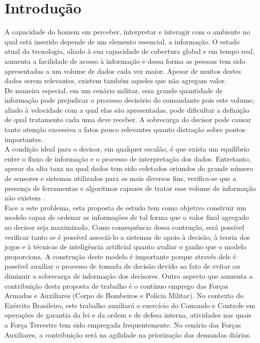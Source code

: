 \documentclass[a4paper,12pt]{article}
\begin{document}
\section{Introdução}
A capacidade do homem em perceber, interpretar e interagir com o ambiente no qual está inserido depende de um elemento essencial, a informação.
O estado atual da tecnologia, aliado à sua capacidade de cobertura global e em tempo real, aumenta a facilidade de acesso à informação e dessa forma as pessoas 
tem sido apresentadas a um volume de dados cada vez maior. Apesar de muitos destes dados serem relevantes, existem também aqueles que não agregam valor.\\
\indent De maneira especial, em um cenário militar, essa grande quantidade de informação pode prejudicar o processo decisório do 
comandante pois este volume, aliado à velocidade com a qual elas são apresentadas, pode dificultar a definição de qual tratamento cada uma deve receber.
A sobrecarga do decisor pode causar tanto atenção excessiva a fatos pouco relevantes quanto distração sobre pontos importantes.\\
\indent A condição ideal para o decisor, em qualquer escalão, é que exista um equilíbrio entre o fluxo de informação e o processo de interpretação dos dados.
Entretanto, apesar da alta taxa na qual dados tem sido coletados oriundos do grande número de sensores e sistemas utilizados para os mais diversos fins, 
verifica-se que a presença de ferramentas e algoritmos capazes de tratar esse volume de informação não existem \cite{Savas 2014}.\\
\indent Face a este problema, esta proposta de estudo tem como objetivo construir um modelo capaz de ordenar as informações 
de tal forma que o valor final agregado ao decisor seja maximizado. Como consequência dessa contrução, será possível verificar 
tanto se é possível associá-lo a sistemas de apoio à decisão, à teoria dos jogos e à técnicas de inteligência artificial quanto 
avaliar o ganho que o modelo proporciona.
\indent A construção deste modelo é importante porque através dele é possível auxiliar o processo de tomada de decisão devido ao fato de evitar ou diminuir 
a sobrecarga de informação dos decisores. Outro aspecto que aumenta a contribuição desta proposta de trabalho é o contínuo emprego das Forças Armadas e 
Auxiliares (Corpo de Bombeiros e Polícia Militar). No contexto do Exército Brasileiro, este trabalho auxiliará o exercício do Comando e Controle em operações 
de garantia da lei e da ordem e de defesa interna, atividades nas quais a Força Terrestre tem sido empregada frequentemente. No cenário das Forças Auxiliares,
a contribuição será na agilidade na priorização das demandas diárias.
\end{document}
